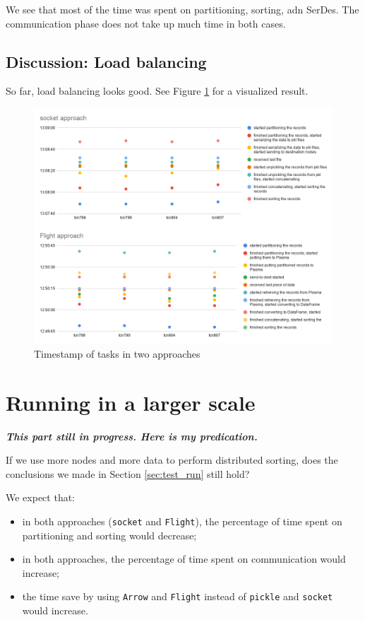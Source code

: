 \documentclass{article}
\begin{document}
We see that most of the time was spent on partitioning, sorting, adn SerDes.
The communication phase does not take up much time in both cases.

\subsection{Discussion: Load balancing}

So far, load balancing looks good.
See Figure \ref{fig:timestamp_socket_vs_flight} for a visualized result.

\begin{figure}[h!]
  \centering
  \includegraphics[width=1.0\textwidth]{timestamp_socket_vs_flight}
  \caption{Timestamp of tasks in two approaches}
  \label{fig:timestamp_socket_vs_flight}
\end{figure}


\section{Running in a larger scale}
\label{sec:todo}
\textbf{\textit{This part still in progress. Here is my predication.}}

If we use more nodes and more data to perform distributed sorting,
does the conclusions we made in Section \ref{sec:test_run} still hold?

We expect that:
\begin{itemize}
  \item in both approaches (\texttt{socket} and \texttt{Flight}), the percentage of time spent on partitioning and sorting would decrease;
  \item in both approaches, the percentage of time spent on communication would increase;
  \item the time save by using \texttt{Arrow} and \texttt{Flight} instead of \texttt{pickle} and \texttt{socket} would increase. 
\end{itemize}
\end{document}
